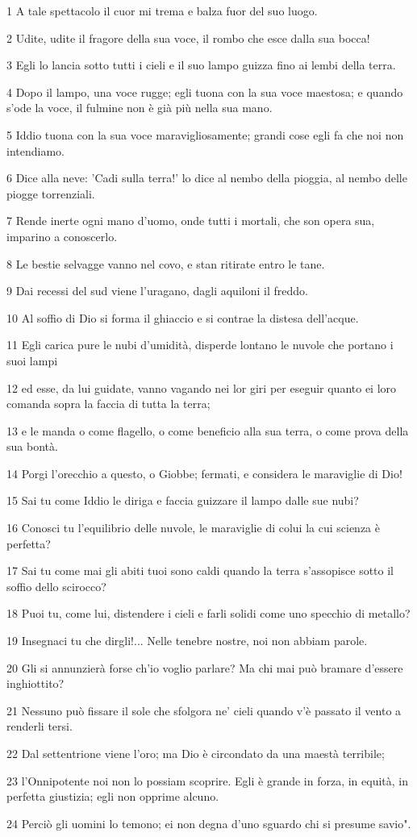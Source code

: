 \par 1 A tale spettacolo il cuor mi trema e balza fuor del suo luogo.
\par 2 Udite, udite il fragore della sua voce, il rombo che esce dalla sua bocca!
\par 3 Egli lo lancia sotto tutti i cieli e il suo lampo guizza fino ai lembi della terra.
\par 4 Dopo il lampo, una voce rugge; egli tuona con la sua voce maestosa; e quando s'ode la voce, il fulmine non è già più nella sua mano.
\par 5 Iddio tuona con la sua voce maravigliosamente; grandi cose egli fa che noi non intendiamo.
\par 6 Dice alla neve: 'Cadi sulla terra!' lo dice al nembo della pioggia, al nembo delle piogge torrenziali.
\par 7 Rende inerte ogni mano d'uomo, onde tutti i mortali, che son opera sua, imparino a conoscerlo.
\par 8 Le bestie selvagge vanno nel covo, e stan ritirate entro le tane.
\par 9 Dai recessi del sud viene l'uragano, dagli aquiloni il freddo.
\par 10 Al soffio di Dio si forma il ghiaccio e si contrae la distesa dell'acque.
\par 11 Egli carica pure le nubi d'umidità, disperde lontano le nuvole che portano i suoi lampi
\par 12 ed esse, da lui guidate, vanno vagando nei lor giri per eseguir quanto ei loro comanda sopra la faccia di tutta la terra;
\par 13 e le manda o come flagello, o come beneficio alla sua terra, o come prova della sua bontà.
\par 14 Porgi l'orecchio a questo, o Giobbe; fermati, e considera le maraviglie di Dio!
\par 15 Sai tu come Iddio le diriga e faccia guizzare il lampo dalle sue nubi?
\par 16 Conosci tu l'equilibrio delle nuvole, le maraviglie di colui la cui scienza è perfetta?
\par 17 Sai tu come mai gli abiti tuoi sono caldi quando la terra s'assopisce sotto il soffio dello scirocco?
\par 18 Puoi tu, come lui, distendere i cieli e farli solidi come uno specchio di metallo?
\par 19 Insegnaci tu che dirgli!... Nelle tenebre nostre, noi non abbiam parole.
\par 20 Gli si annunzierà forse ch'io voglio parlare? Ma chi mai può bramare d'essere inghiottito?
\par 21 Nessuno può fissare il sole che sfolgora ne' cieli quando v'è passato il vento a renderli tersi.
\par 22 Dal settentrione viene l'oro; ma Dio è circondato da una maestà terribile;
\par 23 l'Onnipotente noi non lo possiam scoprire. Egli è grande in forza, in equità, in perfetta giustizia; egli non opprime alcuno.
\par 24 Perciò gli uomini lo temono; ei non degna d'uno sguardo chi si presume savio".

